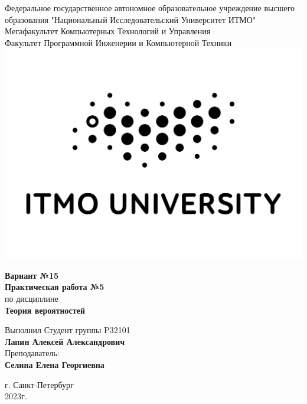 \begin{center}
  Федеральное государственное автономное образовательное учреждение высшего образования "Национальный Исследовательский Университет ИТМО"\\ 
  Мегафакультет Компьютерных Технологий и Управления\\
  Факультет Программной Инженерии и Компьютерной Техники \\
  \includegraphics[scale=0.2]{img/itm.jpg} %
\end{center}
\vspace{1cm}

\begin{center}
  \large \textbf{Вариант №15}\\
  \textbf{Практическая работа №5}\\
  по дисциплине\\
  \textbf{Теория вероятностей}
\end{center}

\vspace{2cm}

\begin{flushright}
Выполнил Студент  группы P32101\\
\textbf{Лапин Алексей Александрович}\\
Преподаватель: \\
\textbf{Селина Елена Георгиевна}\\
\end{flushright}

\vspace{6cm}
\begin{center}
  г. Санкт-Петербург\\
  2023г.
\end{center}